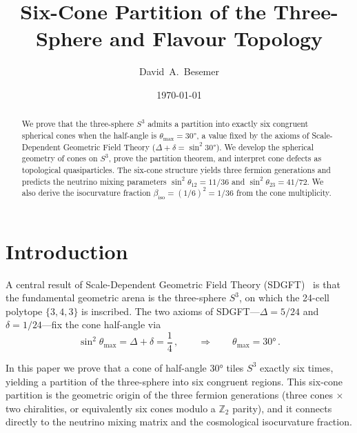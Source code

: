 \documentclass[amsmath,amssymb,aps,prd,twocolumn,superscriptaddress,nofootinbib]{revtex4-2}
\begin{document}

\title{Six-Cone Partition of the Three-Sphere and Flavour Topology}

\author{David~A.~Besemer}
\date{\today}

\begin{abstract}
We prove that the three-sphere $S^3$ admits a partition into exactly six
congruent spherical cones when the half-angle is $\theta_{\max} = 30°$, a
value fixed by the axioms of Scale-Dependent Geometric Field Theory
($\Delta + \delta = \sin^2 30°$).  We develop the spherical geometry of cones
on $S^3$, prove the partition theorem, and interpret cone defects as
topological quasiparticles.  The six-cone structure yields three fermion
generations and predicts the neutrino mixing parameters
$\sin^2\theta_{12} = 11/36$ and $\sin^2\theta_{23} = 41/72$.  We also derive
the isocurvature fraction $\beta_{\mathrm{iso}} = (1/6)^2 = 1/36$ from the
cone multiplicity.
\end{abstract}

\maketitle

\section{Introduction}\label{sec:intro}

A central result of Scale-Dependent Geometric Field Theory
(SDGFT)~\cite{Besemer2026_01,Besemer2026_02} is that the fundamental geometric
arena is the three-sphere $S^3$, on which the 24-cell polytope $\{3,4,3\}$ is
inscribed.  The two axioms of SDGFT---$\Delta = 5/24$ and
$\delta = 1/24$---fix the cone half-angle via
\begin{equation}\label{eq:sin2}
  \sin^2\theta_{\max} = \Delta + \delta = \frac{1}{4}\,,
  \qquad\Longrightarrow\qquad \theta_{\max} = 30°\,.
\end{equation}

In this paper we prove that a cone of half-angle $30°$ tiles $S^3$ exactly
six times, yielding a partition of the three-sphere into six congruent
regions.  This six-cone partition is the geometric origin of the three fermion
generations (three cones $\times$ two chiralities, or equivalently six cones
modulo a $\mathbb{Z}_2$ parity), and it connects directly to the neutrino
mixing matrix and the cosmological isocurvature fraction.
\end{document}
